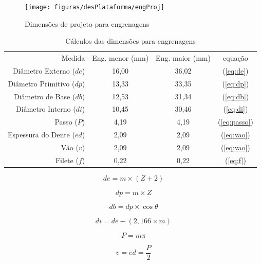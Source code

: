 \begin{figure}[htb]
	\centering
	\caption{Dimensões de projeto para engrenagens}
	\texttt{[image: figuras/desPlataforma/engProj]}
	\label{fig:engProj}
\end{figure}

\begin{table}[!htb]
	\centering
	\caption{Cálculos das dimensões para engrenagens}
	\begin{tabular}{r|c|c|c}
		Medida & Eng. menor (mm) & Eng. maior (mm) & equação\\
		Diâmetro Externo ($ de $) & 16,00 & 36,02 & (\ref{eq:de})\\
		Diâmetro Primitivo ($ dp $) & 13,33 & 33,35 & (\ref{eq:dp})\\
		Diâmetro de Base ($ db $) & 12,53 & 31,34 & (\ref{eq:db})\\
		Diâmetro Interno ($ di $) & 10,45 & 30,46 & (\ref{eq:di})\\
		Passo ($ P $) & 4,19 & 4,19 & (\ref{eq:passo})\\
		Espessura do Dente ($ ed $) & 2,09 & 2,09 & (\ref{eq:vao})\\
		Vão ($ v $) & 2,09 & 2,09 & (\ref{eq:vao})\\
		Filete ($ f $) & 0,22 & 0,22 & (\ref{eq:f})\\
	\end{tabular}
	\label{tab:engrenagens}
	
\end{table}

\begin{equation}
	de = m \times (Z + 2)
	\label{eq:de}
\end{equation}

\begin{equation}
	dp = m \times Z
	\label{eq:dp}
\end{equation}

\begin{equation}
	db = dp\times\cos \theta
	\label{eq:db}
\end{equation}

\begin{equation}
	di = de-(2,166\times m)
	\label{eq:di}
\end{equation}

\begin{equation}
	P = m\pi
	\label{eq:passo}
\end{equation}

\begin{equation}
	v = ed = \dfrac{P}{2}
	\label{eq:vao}
\end{equation}

